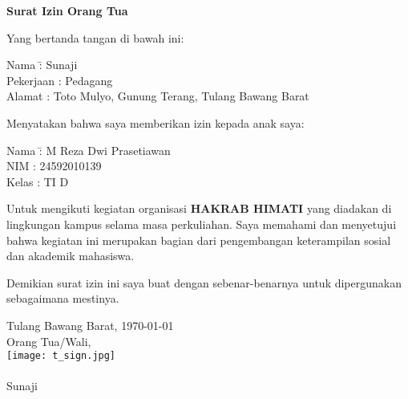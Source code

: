 \documentclass[a4paper,12pt]{article}
\begin{document}
\begin{center}
    \Large\textbf{Surat Izin Orang Tua}
\end{center}

\vspace{0.5cm}

\noindent
Yang bertanda tangan di bawah ini:

\vspace{0.2cm}

\begin{tabbing}
    Nama \hspace{2.2cm} \= : Sunaji \\
    Pekerjaan \> : Pedagang \\
    Alamat \> : Toto Mulyo, Gunung  Terang, Tulang Bawang Barat
\end{tabbing}

\vspace{0.5cm}

\noindent
Menyatakan bahwa saya memberikan izin kepada anak saya:

\vspace{0.2cm}

\begin{tabbing}
    Nama \hspace{2.2cm} \= : M Reza Dwi Prasetiawan\\
    NIM \> : 24592010139 \\
    Kelas \> : TI D
\end{tabbing}

\vspace{0.5cm}

\noindent
Untuk mengikuti kegiatan organisasi \textbf{HAKRAB HIMATI} yang diadakan di lingkungan kampus selama masa perkuliahan. Saya memahami dan menyetujui bahwa kegiatan ini merupakan bagian dari pengembangan keterampilan sosial dan akademik mahasiswa.

\vspace{0.5cm}

\noindent
Demikian surat izin ini saya buat dengan sebenar-benarnya untuk dipergunakan sebagaimana mestinya.

\vspace{1cm}

\begin{flushright}
    Tulang Bawang Barat, \today\\
    Orang Tua/Wali,\\
    \vspace{1cm} %
    \texttt{[image: t\_sign.jpg]} \\ %
    \underline{\hspace{6cm}} \\ %
    Sunaji
\end{flushright}
\end{document}
